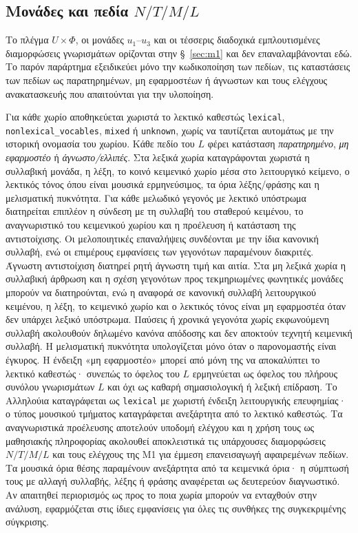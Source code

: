 \documentclass[11pt,a4paper]{article}
\begin{document}
\subsection{\texorpdfstring{Μονάδες και πεδία \(N/T/M/L\)}{Μονάδες και πεδία N/T/M/L}}\label{app:repr-fields}

Το πλέγμα $U\times\Phi$, οι μονάδες $u_1$--$u_3$ και οι τέσσερις διαδοχικά εμπλουτισμένες διαμορφώσεις γνωρισμάτων ορίζονται στην §~\ref{sec:m1} και δεν επαναλαμβάνονται εδώ. Το παρόν παράρτημα εξειδικεύει μόνο την κωδικοποίηση των πεδίων, τις καταστάσεις των πεδίων ως παρατηρημένων, μη εφαρμοστέων ή άγνωστων και τους ελέγχους ανακατασκευής που απαιτούνται για την υλοποίηση.

Για κάθε χωρίο αποθηκεύεται χωριστά το λεκτικό καθεστώς \texttt{lexical}, \texttt{nonlexical\_vocables}, \texttt{mixed} ή \texttt{unknown}, χωρίς να ταυτίζεται αυτομάτως με την ιστορική ονομασία του χωρίου. Κάθε πεδίο του $L$ φέρει κατάσταση \emph{παρατηρημένο}, \emph{μη εφαρμοστέο} ή \emph{άγνωστο/ελλιπές}. Στα λεξικά χωρία καταγράφονται χωριστά η συλλαβική μονάδα, η λέξη, το κοινό κειμενικό χωρίο μέσα στο λειτουργικό κείμενο, ο λεκτικός τόνος όπου είναι μουσικά ερμηνεύσιμος, τα όρια λέξης/φράσης και η μελισματική πυκνότητα. Για κάθε μελωδικό γεγονός με λεκτικό υπόστρωμα διατηρείται επιπλέον η σύνδεση με τη συλλαβή του σταθερού κειμένου, το αναγνωριστικό του κειμενικού χωρίου και η προέλευση ή κατάσταση της αντιστοίχισης. Οι μελοποιητικές επαναλήψεις συνδέονται με την ίδια κανονική συλλαβή, ενώ οι επιμέρους εμφανίσεις των γεγονότων παραμένουν διακριτές. Άγνωστη αντιστοίχιση διατηρεί ρητή άγνωστη τιμή και αιτία. Στα μη λεξικά χωρία η συλλαβική άρθρωση και η σχέση γεγονότων προς τεκμηριωμένες φωνητικές μονάδες μπορούν να διατηρούνται, ενώ η αναφορά σε κανονική συλλαβή λειτουργικού κειμένου, η λέξη, το κειμενικό χωρίο και ο λεκτικός τόνος είναι μη εφαρμοστέα όταν δεν υπάρχει λεξικό υπόστρωμα. Παύσεις ή χρονικά γεγονότα χωρίς εκφωνούμενη συλλαβή ακολουθούν δηλωμένο κανόνα απόδοσης και δεν αποκτούν τεχνητή κειμενική συλλαβή. Η μελισματική πυκνότητα υπολογίζεται μόνο όταν ο παρονομαστής είναι έγκυρος. Η ένδειξη «μη εφαρμοστέο» μπορεί από μόνη της να αποκαλύπτει το λεκτικό καθεστώς· συνεπώς το όφελος του $L$ ερμηνεύεται ως όφελος του πλήρους συνόλου γνωρισμάτων $L$ και όχι ως καθαρή σημασιολογική ή λεξική επίδραση. Το Αλληλούια καταγράφεται ως \texttt{lexical} με χωριστή ένδειξη λειτουργικής επευφημίας· ο τύπος μουσικού τμήματος καταγράφεται ανεξάρτητα από το λεκτικό καθεστώς. Τα αναγνωριστικά προέλευσης αποτελούν υποδομή ελέγχου και η χρήση τους ως μαθησιακής πληροφορίας ακολουθεί αποκλειστικά τις υπάρχουσες διαμορφώσεις $N/T/M/L$ και τους ελέγχους της M1 για έμμεση επανεισαγωγή αφαιρεμένων πεδίων. Τα μουσικά όρια θέσης παραμένουν ανεξάρτητα από τα κειμενικά όρια· η σύμπτωσή τους με αλλαγή συλλαβής, λέξης ή φράσης αναφέρεται ως δευτερεύον διαγνωστικό. Αν απαιτηθεί περιορισμός ως προς το ποια χωρία μπορούν να ενταχθούν στην ανάλυση, εφαρμόζεται στις ίδιες εμφανίσεις για όλες τις συνθήκες της συγκεκριμένης σύγκρισης.
\end{document}
